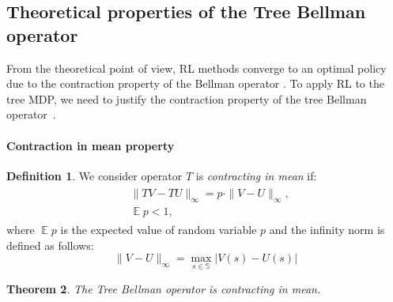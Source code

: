 \documentclass[preprint,12pt]{elsarticle} %
\theoremstyle{plain}
\newtheorem{theorem}{Theorem}[section]
\theoremstyle{definition}
\newtheorem{definition}[theorem]{Definition}
\theoremstyle{remark}
\newcommand{\ex}{\mathop{\mathbb{E}}}
\begin{document}
\subsection{Theoretical properties of the Tree Bellman operator}\label{subsec:contraction_mean}
From the theoretical point of view, RL methods converge to an optimal policy due to the contraction property of the Bellman operator \cite{qlearning_conv}. To apply RL to the tree MDP, we need to justify the contraction property of the tree Bellman operator~\cite{Borovkov2013}. 

\paragraph{Contraction in mean property}
\begin{definition}
We consider operator $T$ is \textit{contracting in mean} if:
\begin{align}
\begin{split}
    & \|TV - TU\|_{\infty} = p \cdot \|V - U\|_{\infty},\\
    & \ex p < 1,
\end{split}
\label{eq:meancont}
\end{align}
where $\ex p$ is the expected value of random variable $p$ and the infinity norm is defined as follows:
\begin{equation}
    \| V - U\|_{\infty} = \max_{s \in \mathbb{S}}|V(s) - U(s)|
\label{eq:infty_norm}
\end{equation}

\end{definition}


\begin{theorem}\label{thm:contraction}
The Tree Bellman operator is contracting in mean.
\end{theorem}
\end{document}
